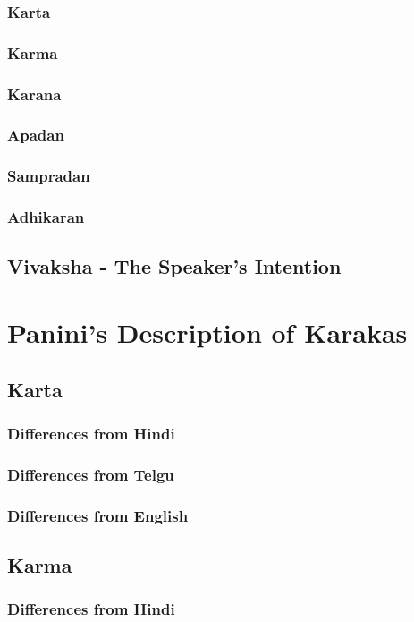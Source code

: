 \documentclass[a4paper,10pt]{article}
\begin{document}
\subsubsection{Karta}
\subsubsection{Karma}
\subsubsection{Karana}
\subsubsection{Apadan}
\subsubsection{Sampradan}
\subsubsection{Adhikaran}
\subsection{Vivaksha - The Speaker's Intention}
\section{Panini's Description of Karakas}
\subsection{Karta}
\subsubsection{Differences from Hindi}
\subsubsection{Differences from Telgu}
\subsubsection{Differences from English}
\subsection{Karma}
\subsubsection{Differences from Hindi}
\end{document}
